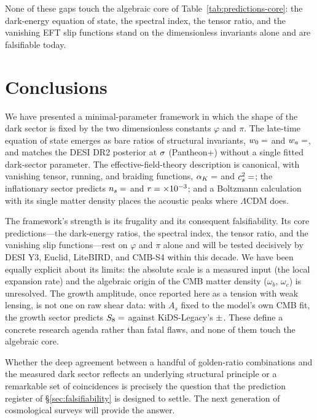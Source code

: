 \documentclass[a4paper,11pt]{article}
\begin{document}
None of these gaps touch the algebraic core of
Table~\ref{tab:predictions-core}: the dark-energy equation of state, the
spectral index, the tensor ratio, and the vanishing EFT slip functions stand on
the dimensionless invariants alone and are falsifiable today.

\section{Conclusions}
\label{sec:conclusions}

We have presented a minimal-parameter framework in which the shape of the dark
sector is fixed by the two dimensionless constants $\varphi$ and $\pi$. The
late-time equation of state emerges as bare ratios of structural invariants,
$w_0=\val{W0_d6}$ and $w_a=\val{WA_d6}$, and matches the DESI DR2 posterior at
$\val{p2_w0wa_ssee_ec26}\sigma$ (Pantheon+) without a single fitted dark-sector parameter. The
effective-field-theory description is canonical, with vanishing tensor, running,
and braiding functions, $\alpha_K=\val{alpha_K_z0_d6}$ and $c_s^2=\val{cs2_condensado_d6}$; the inflationary sector
predicts $n_s=\val{N_S_d6}$ and $r=\val{r_tensor_mil_d1}\times10^{-3}$; and a Boltzmann calculation with its single matter density
places the acoustic peaks where $\Lambda$CDM does.

The framework's strength is its frugality and its consequent falsifiability.
Its core predictions---the dark-energy ratios, the spectral index, the tensor
ratio, and the vanishing slip functions---rest on $\varphi$ and $\pi$ alone and
will be tested decisively by DESI Y3, Euclid, LiteBIRD, and CMB-S4 within this
decade. We have been equally explicit about its limits: the absolute scale is a
measured input (the local expansion rate) and the algebraic origin of the CMB matter density ($\omega_b$, $\omega_c$) is unresolved. The growth amplitude, once reported here as a tension with weak lensing, is not one on raw shear data: with $A_s$ fixed to the model's own CMB fit, the growth sector predicts $S_8=\val{S8_leg_pred}$ against KiDS-Legacy's $\val{S8_legacy_dato}\pm\val{S8_legacy_dato_sigma}$. These
define a concrete research agenda rather than fatal flaws, and none of them
touch the algebraic core.

Whether the deep agreement between a handful of golden-ratio combinations and
the measured dark sector reflects an underlying structural principle or a
remarkable set of coincidences is precisely the question that the prediction
register of \S\ref{sec:falsifiability} is designed to settle. The next
generation of cosmological surveys will provide the answer.
\end{document}
